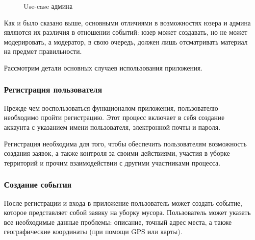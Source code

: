 \documentclass[diploma]{SCWorks}
\begin{document}
\begin{figure}[H]
	\caption{Use-case админа}
	\label{pic:use-case_admin}
\end{figure}

Как и было сказано выше, основными отличиями в возможностях юзера и админа 
являются их различия в отношении событий: юзер может создавать, но не может 
модерировать, а модератор, в свою очередь, должен лишь отсматривать материал
на предмет правильности.

Рассмотрим детали основных случаев использования приложения.

\subsubsection{Регистрация пользователя}

Прежде чем воспользоваться функционалом приложения, пользователю необходимо 
пройти регистрацию. Этот процесс включает в себя создание аккаунта с указанием 
имени пользователя, электронной почты и пароля. 

Регистрация необходима для того, чтобы обеспечить пользователям возможность 
создания заявок, а также контроля за своими действиями, участия в уборке 
территорий и прочим взаимодействии с другими участниками процесса.

\subsubsection{Создание события}

После регистрации и входа в приложение пользователь может создать событие, 
которое представляет собой заявку на уборку мусора. Пользователь может 
указать все необходимые данные проблемы: описание, точный адрес 
места, а также географические координаты (при помощи GPS или карты). 
\end{document}
